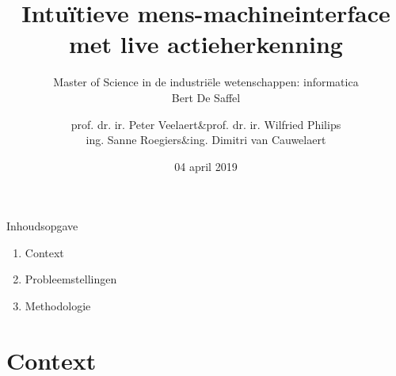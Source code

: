 \documentclass[]{beamer}
\begin{document}
	\title[Actieherkenning met de Kinect sensor]{Intuïtieve mens-machineinterface met live actieherkenning }
	\author[Bert De Saffel]{
				\begin{tabular}{rcr}
				prof. dr. ir. Peter Veelaert &\&& prof. dr. ir. Wilfried Philips \\
				ing. Sanne Roegiers &\&& ing. Dimitri van Cauwelaert
				\end{tabular}
	}
	
	\subtitle{Master of Science in de industriële wetenschappen: informatica \\ \vspace{0.2cm} Bert De Saffel}
	\date{04 april 2019}
	\frame{\titlepage}
	
	\begin{frame}{Inhoudsopgave}
		\begin{enumerate}
			\item Context
			\item Probleemstellingen
			\item Methodologie
		\end{enumerate}
	\end{frame}
	
	\section{Context}
\end{document}
